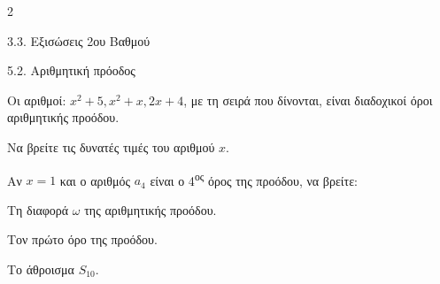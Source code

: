\begin{ylh}{2}
    \item 3.3. Εξισώσεις 2ου Βαθμού
    \item 5.2. Αριθμητική πρόοδος
\end{ylh}
Οι αριθμοί: $x^2+5, x^2+x, 2x+4$, με τη σειρά που δίνονται, είναι διαδοχικοί όροι αριθμητικής προόδου.

\begin{alist}
\item Να βρείτε τις δυνατές τιμές του αριθμού $x$.
\item Αν $x=1$ και ο αριθμός $a_4$ είναι ο 4\textsuperscript{ος} όρος της προόδου, να βρείτε:

\begin{rlist}
\item Τη διαφορά $\omega$ της αριθμητικής προόδου.
\item Τον πρώτο όρο της προόδου.
\item Το άθροισμα $S_{10}$.
\end{rlist}
\end{alist}


